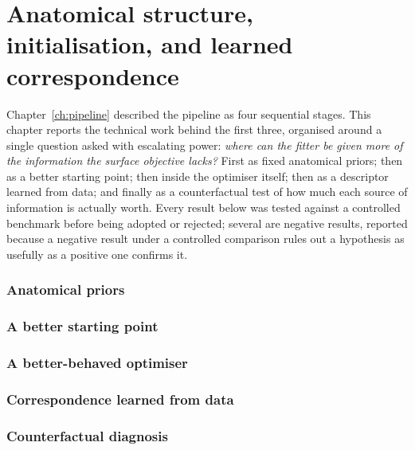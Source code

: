 \chapter{Anatomical structure, initialisation, and learned correspondence}
\label{ch:structure}

Chapter~\ref{ch:pipeline} described the pipeline as four sequential stages.
This chapter reports the technical work behind the first three, organised
around a single question asked with escalating power: \emph{where can the
fitter be given more of the information the surface objective lacks?} First
as fixed anatomical priors; then as a better starting point; then inside the
optimiser itself; then as a descriptor learned from data; and finally as a
counterfactual test of how much each source of information is actually
worth. Every result below was tested against a controlled benchmark before
being adopted or rejected; several are negative results, reported because a
negative result under a controlled comparison rules out a hypothesis as
usefully as a positive one confirms it.

\subsection*{Anatomical priors}




\subsection*{A better starting point}


\subsection*{A better-behaved optimiser}


\subsection*{Correspondence learned from data}


\subsection*{Counterfactual diagnosis}

